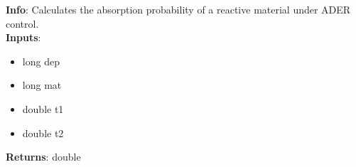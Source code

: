 \textbf{Info}: Calculates the absorption probability of a reactive material
under ADER control. \\

\noindent \textbf{Inputs}:
\begin{itemize}
\item{long dep}
\item{long mat}
\item{double t1}
\item{double t2}
\end{itemize}

\noindent \textbf{Returns}: double
